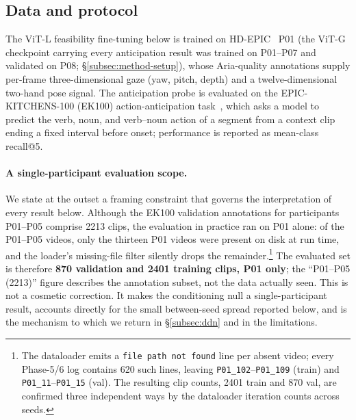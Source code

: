 \subsection{Data and protocol}
\label{subsec:protocol}

The ViT-L feasibility fine-tuning below is trained on
HD-EPIC~\citep{perrett2025hdepic} P01 (the ViT-G checkpoint carrying every
anticipation result was trained on P01--P07 and validated on P08;
\S\ref{subsec:method-setup}),
whose Aria-quality annotations supply per-frame three-dimensional gaze
(yaw, pitch, depth) and a twelve-dimensional two-hand pose signal. The
anticipation probe is evaluated on the EPIC-KITCHENS-100 (EK100)
action-anticipation task~\citep{damen2022ek100}, which asks a model to predict
the verb, noun, and verb--noun action of a segment from a context clip ending a
fixed interval before onset; performance is reported as mean-class recall@5.

\paragraph{A single-participant evaluation scope.}
We state at the outset a framing constraint that governs the interpretation of
every result below. Although the EK100 validation annotations for participants
P01--P05 comprise \num{2213} clips, the evaluation in practice ran on P01 alone:
of the P01--P05 videos, only the thirteen P01 videos were present on disk at run
time, and the loader's missing-file filter silently drops the
remainder.\footnote{The dataloader emits a \texttt{file path not found} line per
absent video; every Phase-5/6 log contains 620 such lines, leaving
\texttt{P01\_102}--\texttt{P01\_109} (train) and \texttt{P01\_11}--\texttt{P01\_15}
(val). The resulting clip counts, \num{2401} train and \num{870} val, are
confirmed three independent ways by the dataloader iteration counts across
seeds.} The evaluated set is therefore \textbf{\num{870} validation and
\num{2401} training clips, P01 only}; the ``P01--P05 (\num{2213})'' figure
describes the annotation subset, not the data actually seen. This is not a
cosmetic correction. It makes the conditioning null a single-participant result,
accounts directly for the small between-seed spread reported below, and is the
mechanism to which we return in \S\ref{subsec:ddn} and in the limitations.

